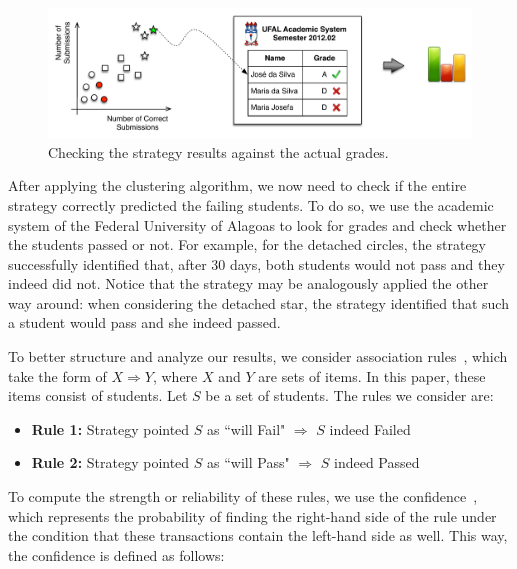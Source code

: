 \begin{figure}[htb]
\centering
\includegraphics[width=1.0\textwidth,natwidth=610,natheight=642]{images/Procedure.pdf}
\caption{Checking the strategy results against the actual grades.}
\label{fig:procedure}
\end{figure}

After applying the clustering algorithm, we now need to check if the entire strategy correctly predicted the failing students. To do so, we use the academic system of the Federal University of Alagoas to look for grades and check whether the students passed or not. For example, for the detached circles, the strategy successfully identified that, after 30 days, both students would not pass and they indeed did not. Notice that the strategy may be analogously applied the other way around: when considering the detached star, the strategy identified that such a student would pass and she indeed passed.


To better structure and analyze our results, we consider association rules~\cite{}, which take the form of $X \Rightarrow Y$, where $X$ and $Y$ are sets of items. In this paper, these items consist of students. Let $S$ be a set of students. The rules we consider are:

\begin{itemize}

	\item \textbf{Rule 1:} Strategy pointed $S$ as ``will Fail" $\Rightarrow$ $S$ indeed Failed

	\item \textbf{Rule 2:} Strategy pointed $S$ as ``will Pass" $\Rightarrow$ $S$ indeed Passed

\end{itemize}

To compute the strength or reliability of these rules, we use the confidence~\cite{}, which represents the probability of finding the right-hand side of the rule under the condition that these transactions contain the left-hand side as well. This way, the confidence is defined as follows:

